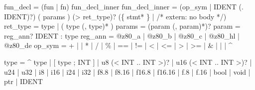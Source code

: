 \documentclass[
  11pt,
]{article}
\newenvironment{Shaded}{}{}
\newcommand{\NormalTok}[1]{#1}
\begin{document}
\begin{Shaded}
\begin{Highlighting}[]
\NormalTok{fun\_decl       = (\textquotesingle{}fun\textquotesingle{} | \textquotesingle{}fn\textquotesingle{}) fun\_decl\_inner}
\NormalTok{fun\_decl\_inner = (op\_sym | IDENT (\textquotesingle{}.\textquotesingle{} IDENT)?) \textquotesingle{}(\textquotesingle{} params \textquotesingle{})\textquotesingle{} (\textquotesingle{}{-}\textgreater{}\textquotesingle{} ret\_type)?}
\NormalTok{                 (\textquotesingle{}\{\textquotesingle{} stmt* \textquotesingle{}\}\textquotesingle{} | /* extern: no body */)}
\NormalTok{ret\_type       = type | \textquotesingle{}(\textquotesingle{} type (\textquotesingle{},\textquotesingle{} type)* \textquotesingle{})\textquotesingle{}}
\NormalTok{params         = (param (\textquotesingle{},\textquotesingle{} param)*)?}
\NormalTok{param          = reg\_ann? IDENT \textquotesingle{}:\textquotesingle{} type}
\NormalTok{reg\_ann        = \textquotesingle{}@z80\_a\textquotesingle{} | \textquotesingle{}@z80\_b\textquotesingle{} | \textquotesingle{}@z80\_c\textquotesingle{} | \textquotesingle{}@z80\_hl\textquotesingle{} | \textquotesingle{}@z80\_de\textquotesingle{}}
\NormalTok{op\_sym         = \textquotesingle{}+\textquotesingle{} | \textquotesingle{}{-}\textquotesingle{} | \textquotesingle{}*\textquotesingle{} | \textquotesingle{}/\textquotesingle{} | \textquotesingle{}\%\textquotesingle{} | \textquotesingle{}==\textquotesingle{} | \textquotesingle{}!=\textquotesingle{} | \textquotesingle{}\textless{}\textquotesingle{} | \textquotesingle{}\textless{}=\textquotesingle{}}
\NormalTok{               | \textquotesingle{}\textgreater{}\textquotesingle{} | \textquotesingle{}\textgreater{}=\textquotesingle{} | \textquotesingle{}\&\textquotesingle{} | \textquotesingle{}|\textquotesingle{} | \textquotesingle{}\^{}\textquotesingle{}}

\NormalTok{type           = \textquotesingle{}\^{}\textquotesingle{} type}
\NormalTok{               | \textquotesingle{}[\textquotesingle{} type \textquotesingle{};\textquotesingle{} INT \textquotesingle{}]\textquotesingle{}}
\NormalTok{               | \textquotesingle{}u8\textquotesingle{} (\textquotesingle{}\textless{}\textquotesingle{} INT \textquotesingle{}..\textquotesingle{} INT \textquotesingle{}\textgreater{}\textquotesingle{})?}
\NormalTok{               | \textquotesingle{}u16\textquotesingle{} (\textquotesingle{}\textless{}\textquotesingle{} INT \textquotesingle{}..\textquotesingle{} INT \textquotesingle{}\textgreater{}\textquotesingle{})?}
\NormalTok{               | \textquotesingle{}u24\textquotesingle{} | \textquotesingle{}u32\textquotesingle{} | \textquotesingle{}i8\textquotesingle{} | \textquotesingle{}i16\textquotesingle{} | \textquotesingle{}i24\textquotesingle{} | \textquotesingle{}i32\textquotesingle{}}
\NormalTok{               | \textquotesingle{}f8.8\textquotesingle{} | \textquotesingle{}f8.16\textquotesingle{} | \textquotesingle{}f16.8\textquotesingle{} | \textquotesingle{}f16.16\textquotesingle{} | \textquotesingle{}f.8\textquotesingle{} | \textquotesingle{}f.16\textquotesingle{}}
\NormalTok{               | \textquotesingle{}bool\textquotesingle{} | \textquotesingle{}void\textquotesingle{} | \textquotesingle{}ptr\textquotesingle{}}
\NormalTok{               | IDENT}


\end{Highlighting}
\end{Shaded}
\end{document}
